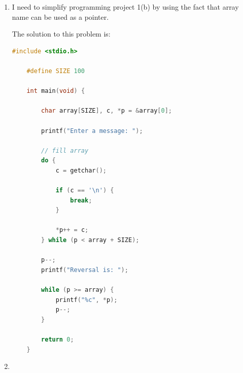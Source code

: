 \documentclass[12pt]{article}
\begin{document}
\begin{enumerate}[1.]
\begin{enumerate}[a)]
\begin{lstlisting}[language=c]
            if (!isalpha(c)) {
                continue;
            }

            *p++ = tolower(c);
            n++;
        } while (n < SIZE);

        // Check if characters in array is palindrome
        if (is_palindrome(array, n)) {
            printf("Palindrome");
        } else {
            printf("Not a Palindrome");
        }

        return 0;
    }

    bool is_palindrome(char array[], int n) {
        char *p = &array[0],
             *q = &array[n-1];

        while (p < q) {
            if (*p++ != *q--) {
                return false;
            }
        }

        return true;
    }
\end{lstlisting}


    \end{enumerate}

    \item

    I need to simplify programming project 1(b) by using the fact that
    array name can be used as a pointer.

    \bigskip

    The solution to this problem is:

    \bigskip

\begin{lstlisting}[language=c]
    #include <stdio.h>

    #define SIZE 100

    int main(void) {

        char array[SIZE], c, *p = &array[0];

        printf("Enter a message: ");

        // fill array
        do {
            c = getchar();

            if (c == '\n') {
                break;
            }

            *p++ = c;
        } while (p < array + SIZE);

        p--;
        printf("Reversal is: ");

        while (p >= array) {
            printf("%c", *p);
            p--;
        }

        return 0;
    }
\end{lstlisting}

    \item


\end{enumerate}
\end{document}
